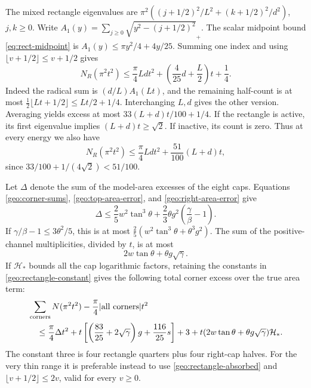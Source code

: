 \documentclass[11pt,reqno]{amsart}
\numberwithin{equation}{section}
\begin{document}
The mixed rectangle eigenvalues are
$\pi^2((j+1/2)^2/L^2+(k+1/2)^2/d^2)$, $j,k\ge0$.
Write $A_1(y)=\sum_{j\ge0}\sqrt{y^2-(j+1/2)^2}_+$.
The scalar midpoint bound \eqref{eq:rect-midpoint} is
$A_1(y)\le\pi y^2/4+4y/25$.
Summing one index and using $\lfloor v+1/2\rfloor\le v+1/2$ gives
\begin{equation}\label{geo:rectangle-constant}
 N_R(\pi^2t^2)\le\frac\pi4Ldt^2
                      +\left(\frac4{25}d+\frac L2\right)t+\frac14.
\end{equation}
Indeed the radical sum is $(d/L)A_1(Lt)$, and the remaining half-count
is at most $\tfrac12\lfloor Lt+1/2\rfloor\le Lt/2+1/4$.
Interchanging $L,d$ gives the other version.  Averaging yields excess
at most $33(L+d)t/100+1/4$.  If the rectangle is active, its first
eigenvalue implies $(L+d)t\ge\sqrt2$.  If inactive, its count is zero.
Thus at every energy we also have
\begin{equation}\label{geo:rectangle-absorbed}
 N_R(\pi^2t^2)\le\frac\pi4Ldt^2+\frac{51}{100}(L+d)t,
\end{equation}
since $33/100+1/(4\sqrt2)<51/100$.

Let $\Delta$ denote the sum of the model-area excesses of the eight caps.
Equations \eqref{geo:corner-sums}, \eqref{geo:top-area-error}, and
\eqref{geo:right-area-error} give
\begin{equation}\label{geo:area-excess}
 \Delta\le\frac25w^2\tan^3\theta
        +\frac23\theta g^2\left(\frac\gamma\beta-1\right).
\end{equation}
If $\gamma/\beta-1\le3\theta^2/5$, this is at most
$\tfrac25(w^2\tan^3\theta+\theta^3g^2)$.
The sum of the positive-channel multiplicities, divided by $t$, is at
most
\begin{equation}\label{geo:channel-total}
 2w\tan\theta+\theta g\sqrt\gamma.
\end{equation}
If $\mathcal H_*$ bounds all the cap logarithmic factors, retaining the
constants in \eqref{geo:rectangle-constant} gives the following total
corner excess over the true area term:
\begin{align}
 &\sum_{\rm corners}N(\pi^2t^2)
                   -\frac\pi4|\text{all corners}|t^2\notag\\
 &\quad\le\frac\pi4\Delta t^2
   +t\left[\left(\frac{83}{25}+2\sqrt\gamma\right)g
                                      +\frac{116}{25}s\right]+3
   +t(2w\tan\theta+\theta g\sqrt\gamma)\mathcal H_*.
                                                    \label{geo:corner-budget}
\end{align}
The constant three is four rectangle quarters plus four right-cap
halves.  For the very thin range it is preferable instead to use
\eqref{geo:rectangle-absorbed} and
$\lfloor v+1/2\rfloor\le2v$, valid for every $v\ge0$.
\end{document}
